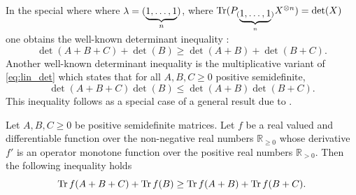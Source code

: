 \documentclass[notitlepage, 10pt]{article}
\begin{document}
In the special where where $\lambda = (\underbrace{1,\ldots,1}_n)$, where $\operatorname{Tr}(P_{(\underbrace{1,\ldots,1}_n)} X^{\otimes n}) = \det(X)$ one obtains the well-known determinant inequality \cite[Lemma 2.2]{tie2011rearrangement}:
\begin{equation}
    \label{eq:lin_det}
    \det(A+B+C) + \det(B) \geq \det(A+B) + \det(B+C).
\end{equation}
Another well-known determinant inequality is the multiplicative variant of \cref{eq:lin_det} which states that for all $A,B,C \geq 0 $ positive semidefinite,
\begin{equation}
    \label{eq:mul_det}
    \det(A+B+C)\det(B) \leq \det(A+B)\det(B+C).
\end{equation}
This inequality follows as a special case of a general result due to \citeauthor{sagnol2013approximation} \cite[Proposition 2.3]{sagnol2013approximation}.
\begin{thm}
    \label{thm:sagnol_ineq}
    Let $A,B,C \geq 0$ be positive semidefinite matrices.
    Let $f$ be a real valued and differentiable function over the non-negative real numbers $\mathbb R_{\geq 0}$ whose derivative $f'$ is an operator monotone function over the positive real numbers $\mathbb R_{>0}$.
    Then the following inequality holds
    \begin{equation}
        \label{eq:sagnol_ineq}
        \operatorname{Tr} f(A+B+C)
        +
        \operatorname{Tr} f(B)
        \geq
        \operatorname{Tr} f(A+B)
        +
        \operatorname{Tr} f(B+C).
    \end{equation}
\end{thm}
\end{document}
